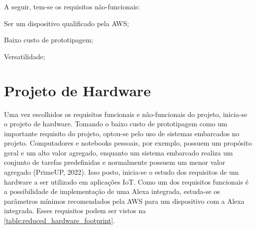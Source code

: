 A seguir, tem-se os requisitos não-funcionais:

\begin{alineas}
    \item Ser um dispositivo qualificado pela AWS;
    \item Baixo custo de prototipagem;
    \item Versatilidade;
\end{alineas}

\section{Projeto de Hardware}

Uma vez escolhidos os requisitos funcionais e não-funcionais do projeto, inicia-se o projeto de hardware. Tomando o baixo custo de prototipagem como um importante requisito do projeto, optou-se pelo uso de sistemas embarcados no projeto. Computadores e notebooks pessoais, por exemplo, possuem um propósito geral e um alto valor agregado, enquanto um sistema embarcado realiza um conjunto de tarefas predefinidas e normalmente possuem um menor valor agregado (PrimeUP, 2022). Isso posto, inicia-se o estudo dos requisitos de um hardware a ser utilizado em aplicações IoT. Como um dos requisitos funcionais é a possibilidade de implementação de uma Alexa integrada, estuda-se os parâmetros mínimos recomendados pela AWS para um dispositivo com a Alexa integrada. Esses requisitos podem ser vistos na \autoref{table:reduced_hardware_footprint}.



